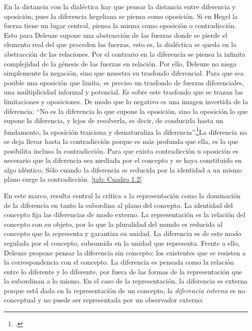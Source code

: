 En la distancia con la dialéctica hay que pensar la distancia entre diferencia y oposición, pues la diferencia hegeliana se piensa como oposición. Si en Hegel la fuerza tiene un lugar central, piensa la misma como oposición o contradicción. Esto para Deleuze supone una abstracción de las fuerzas donde se pierde el elemento real del que proceden las fuerzas, esto es, la dialéctica se queda en la abstracción de las relaciones. Por el contrario en la diferencia se piensa la infinita complejidad de la génesis de las fuerzas en relación. Por ello, Deleuze no niega simplemente la negación, sino que muestra su trasfondo diferencial. Para que sea posible una oposición que limita, es preciso un trasfondo de fuerzas diferenciales, una multiplicidad informal y potencial. Es sobre este trasfondo que se trazan las limitaciones y oposiciones. De modo que lo negativo es una imagen invertida de la diferencia: \enquote{No es la diferencia lo que supone la oposición, sino la oposición lo que supone la diferencia, y lejos de resolverla, es decir, de conducirla hasta un fundamento, la oposición traiciona y desnaturaliza la diferencia}.\footcite[94]{@6961-DELEUZE2002}La diferencia no se deja llevar hasta la contradicción porque es más profunda que ella, es la que posibilita incluso la contradicción. Para que exista contradicción u oposición es necesario que la diferencia sea mediada por el concepto y se haya constituido en algo idéntico. Sólo cuando la diferencia es reducida por la identidad a un mismo plano surge la contradicción. \ref{tab: Cuadro 1.2} %

En este marco, resulta central la crítica a la representación como la dominación de la diferencia en tanto la subordina al plano del concepto. La identidad del concepto fija las diferencias de modo externo. La representación es la relación del concepto con su objeto, por lo que la pluralidad del mundo es reducida al concepto que la representa y garantiza su unidad. La diferencia es de este modo regulada por el concepto, subsumida en la unidad que representa. Frente a ello, Deleuze propone pensar la diferencia sin concepto: los existentes que se resisten a la correspondencia con el concepto. La diferencia es pensada como la relación entre lo diferente y lo diferente, por fuera de las formas de la representación que la subordinan a lo mismo. En el caso de la representación, la diferencia es externa porque está dada en la representación de un concepto, la \emph{diferencia interna} es no conceptual y no puede ser representada por un observador externo:

